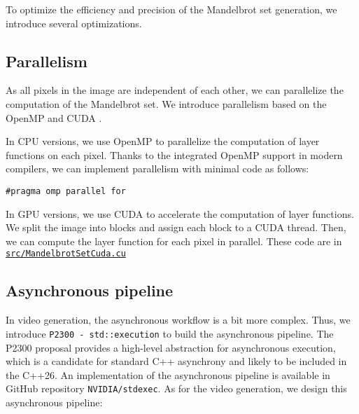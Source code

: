 To optimize the efficiency and precision of the Mandelbrot set generation, we introduce several optimizations.

\subsection{Parallelism}\label{subsec:parallelism}

As all pixels in the image are independent of each other, we can parallelize the computation of the Mandelbrot set.
We introduce parallelism based on the OpenMP and CUDA .

In CPU versions, we use OpenMP to parallelize the computation of layer functions on each pixel.
Thanks to the integrated OpenMP support in modern compilers, we can implement parallelism with minimal code as
follows:

\begin{lstlisting}[gobble=8, label={lst:openmp_parallel_for}]
    #pragma omp parallel for
\end{lstlisting}

In GPU versions, we use CUDA to accelerate the computation of layer functions.
We split the image into blocks and assign each block to a CUDA thread.
Then, we can compute the layer function for each pixel in parallel.
These code are in \href{https://github.com/AI1379/MandelbrotSet/blob/master/src/MandelbrotSetCuda.cu}
{\texttt{src/MandelbrotSetCuda.cu}}

\subsection{Asynchronous pipeline}\label{subsec:asynchronous-pipeline}

In video generation, the asynchronous workflow is a bit more complex.
Thus, we introduce \texttt{P2300 - std::execution}\textsuperscript{\cite{P2300Proposal}}
to build the asynchronous pipeline.
The P2300 proposal provides a high-level abstraction for asynchronous execution, which is a candidate for standard
C++ asynchrony and likely to be included in the C++26.
An implementation of the asynchronous pipeline is available in GitHub repository
\texttt{NVIDIA/stdexec}\textsuperscript{\cite{stdexec}}.
As for the video generation, we design this asynchronous pipeline:

\vspace{0.5cm}

